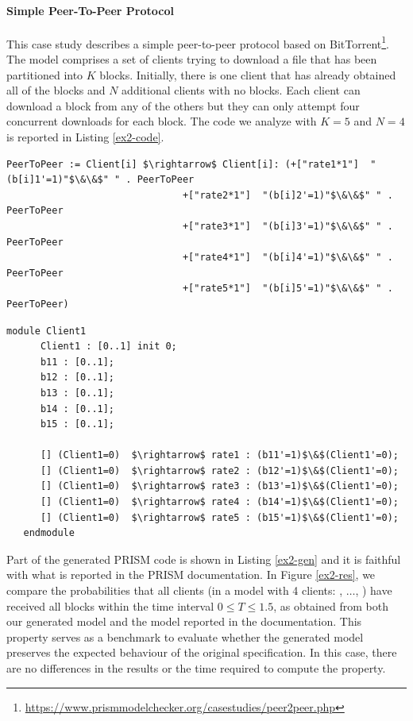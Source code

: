 \paragraph{Simple Peer-To-Peer Protocol}
This case study describes a simple peer-to-peer protocol based on BitTorrent\footnote{\url{https://www.prismmodelchecker.org/casestudies/peer2peer.php}}. The model comprises a set of clients trying to download a file that has been partitioned into $K$ blocks. Initially, there is one client that has already obtained all of the blocks and $N$ additional clients with no blocks. Each client can download a block from any of the others but they can only attempt four concurrent downloads for each block. The code we analyze with $K=5$ and $N=4$ is reported in Listing \ref{ex2-code}.
\begin{lstlisting}[style=chor-color,caption={Choreography for the Peer-To-Peer Protocol},captionpos=b,label={ex2-code}]
PeerToPeer := Client[i] $\rightarrow$ Client[i]: (+["rate1*1"]  "(b[i]1'=1)"$\&\&$" " . PeerToPeer
			                   +["rate2*1"]  "(b[i]2'=1)"$\&\&$" " . PeerToPeer
			                   +["rate3*1"]  "(b[i]3'=1)"$\&\&$" " . PeerToPeer
			                   +["rate4*1"]  "(b[i]4'=1)"$\&\&$" " . PeerToPeer
			                   +["rate5*1"]  "(b[i]5'=1)"$\&\&$" " . PeerToPeer)
\end{lstlisting} 

\begin{lstlisting}[style=prism-color,caption={Part of the generated PRISM program for the Peer-To-Peer Protocol},captionpos=b,label={ex2-gen}]
   module Client1
      Client1 : [0..1] init 0;
      b11 : [0..1]; 
      b12 : [0..1]; 
      b13 : [0..1]; 
      b14 : [0..1]; 
      b15 : [0..1]; 
   
      [] (Client1=0)  $\rightarrow$ rate1 : (b11'=1)$\&$(Client1'=0); 
      [] (Client1=0)  $\rightarrow$ rate2 : (b12'=1)$\&$(Client1'=0); 
      [] (Client1=0)  $\rightarrow$ rate3 : (b13'=1)$\&$(Client1'=0); 
      [] (Client1=0)  $\rightarrow$ rate4 : (b14'=1)$\&$(Client1'=0); 
      [] (Client1=0)  $\rightarrow$ rate5 : (b15'=1)$\&$(Client1'=0); 
   endmodule
   \end{lstlisting}
Part of the generated PRISM code is shown in Listing \ref{ex2-gen} and it is faithful with what is reported in the PRISM documentation. 
In Figure \ref{ex2-res}, we compare the probabilities that all clients (in a model with 4 
clients: , $\ldots$, ) have received all blocks 
within the time interval $0 \leq T \leq 1.5$, as obtained from both our generated model 
and the model reported in the documentation. This property serves as a benchmark to 
evaluate whether the generated model preserves the expected behaviour of the original 
specification. In this case, there are no differences in the results or the time required 
to compute the property.

